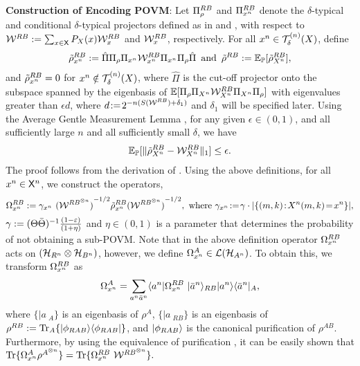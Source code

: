 \vspace{2pt}
\noindent\textbf{Construction of Encoding POVM}:
Let $\Pi_{\rho}^{R B}$ and $\Pi_{x^n}^{R B}$ denote the $\delta$-typical and conditional $\delta$-typical projectors defined as in \cite[Def. 15.1.3]{wilde_arxivBook} and \cite[Def. 15.2.4]{wilde_arxivBook}, with respect to $\mathcal{W}^{R B} := \sum_{x\in\mathsf{X}} P_X(x)\mathcal{W}^{R B}_x$ and $\mathcal{W}_{x}^{R B}$, respectively.
For all $x^n \in \mathcal{T}_{{\delta}}^{(n)}({X})$, define  
\begin{align*}
    \rhotilde_{\xn}^{\refe B} \deq \hat{\Pi} \Pi_{\rho}\Pi_{\xn}\calW_{\xn}^{\refe B}\Pi_{\xn}\Pi_{\rho}\hat{\Pi} \ \! \eqand \ \! \rhotilde^{\refe B} \deq \EE_{\PP}[\rhotilde_{\Xn}^{\refe B}],
\end{align*}
and $\tilde{\rho}_{x^n}^{R B} = 0$ for $x^n \notin \mathcal{T}_{{\delta}}^{(n)}({X})$, where $\hat{\Pi}$ is the cut-off 
 projector onto the subspace spanned by the eigenbasis of $\mathbb{E}[\Pi_{\rho}\Pi_{X^n}\mathcal{W}_{X^n}^{R B}\Pi_{X^n}\Pi_{\rho}]$ with eigenvalues greater than $\epsilon d$, where $d \!:=\! 2^{-n(S(\mathcal{W}^{R B})+\delta_1)}$ and $\delta_1$ will be specified later.  
 Using the Average Gentle Measurement Lemma \cite[Lemma 9.4.3]{wilde_arxivBook}, for any given $\epsilon \in (0,1)$, and all sufficiently large $n$ and all sufficiently small $\delta$, we have 
\begin{align} \label{eq:closeness_ref_SI}
    \mathbb{E}_{\mathbb{P}}[\|\tilde{\rho}_{X^n}^{R B}  - \mathcal{W}_{X^n}^{R B} \|_1] \leq \epsilon.
\end{align}
The proof follows from the derivation of \cite[Eq. 35]{wilde_e}. Using the above definitions, for all $x^n \in \mathsf{X}^n$, we construct the operators,
\vspace{-0.065in}
\[\epovm_{\xn}^{\refe B} \deq \gamma_{\xn}\ {(\calW^{{\refe B}^{\tensor n}})}^{-1/2} \rhotilde_{\xn}^{\refe B} {(\calW^{{\refe B}^{\tensor n}})}^{-1/2} ,\text{ where }\gamma_{\xn} \!\deq\! \gamma \cdot |\{(m,k)\!:\!\Xn(m,k)\! =\! \xn\}|,\]
 $\gamma := (\Theta\bar{\Theta})^{-1}  \frac{(1-\varepsilon)}{(1+\eta)}$ and $\eta \in (0,1)$ is a parameter that determines the probability of not obtaining a sub-POVM. Note that in the above definition operator  $\Omega_{x^n}^{R B}$ acts on $(\mathcal{H}_{R^n} \otimes \mathcal{H}_{B^n})$, however, we define $\Omega^{A}_{x^n} \in \mathcal{L}(\mathcal{H}_{A^n})$. To obtain this, we transform $\Omega_{x^n}^{R B}$ as 
\[\Omega_{x^n}^{A} = \sum_{a^n \bar{a}^n} \langle a^n|\Omega_{x^n}^{R B} \ |\bar{a}^n\rangle_{R B} |a^n\rangle\langle\bar{a}^n|_{A},\]
where $\{|a\>_A\}$ is an eigenbasis of $\rho^A$, $\{|a\>_{RB}\}$ is an eigenbasis of $\rho^{R B} := \text{Tr}_A\{|\phi_{R AB}\rangle\langle\phi_{R AB}|\}$, and $|\phi_{R AB}\rangle$ is the canonical purification of $\rho^{AB}$. Furthermore, by using the equivalence of purification \cite[Thm. 5.1.1]{wilde_arxivBook}, it can be easily shown that $\text{Tr}\{\Omega_{x^n}^A\rho^{A^{\otimes n}}\} = \text{Tr}\{\Omega_{x^n}^{R B} \ \mathcal{W}^{R B ^{\otimes n}}\}.$

